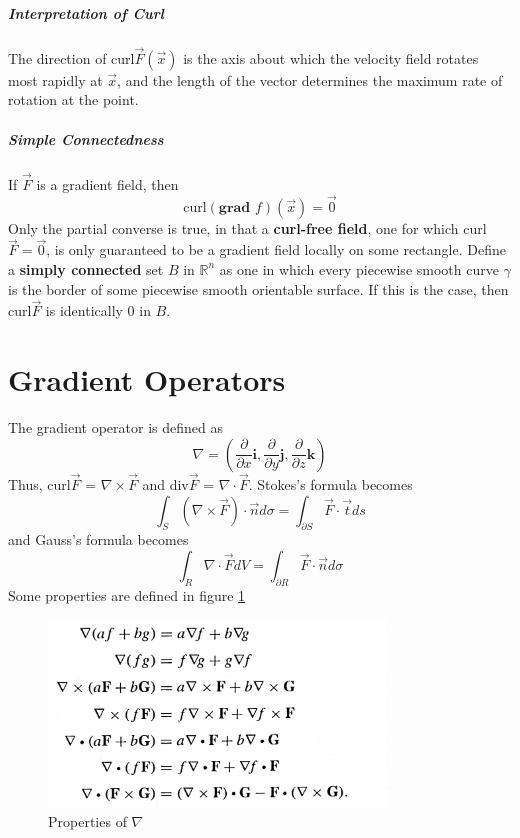 \documentclass[11pt]{article}
\begin{document}
	\subparagraph{Interpretation of Curl} The direction of curl$\vec{F}(\vec{x})$ is the axis about which the velocity field rotates most rapidly at $\vec{x}$, and the length of the vector determines the maximum rate of rotation at the point. 
	
	\subparagraph{Simple Connectedness} If $\vec{F}$ is a gradient field, then 
		\begin{equation}
			\text{curl}(\textbf{grad } f)(\vec{x}) = \vec{0}
		\end{equation}
		Only the partial converse is true, in that a \textbf{curl-free field}, one for which curl$\vec{F} = \vec{0}$, is only guaranteed to be a gradient field locally on some rectangle. Define a \textbf{simply connected} set $B$ in $\mathbb{R}^n$ as one in which every piecewise smooth curve $\gamma$ is the border of some piecewise smooth orientable surface. If this is the case, then curl$\vec{F}$ is identically 0 in $B$.
		
\section{Gradient Operators}
	The gradient operator is defined as
	\begin{equation}
		\nabla = \left( \frac{\partial}{\partial x} \mathbf{i}, \frac{\partial}{\partial y} \mathbf{j}, \frac{\partial}{\partial z} \mathbf{k} \right)
	\end{equation}
	Thus, curl$\vec{F}$ = $\nabla \times \vec{F}$ and div$\vec{F}$ = $\nabla \cdot \vec{F}$. Stokes's formula becomes
	\begin{equation}
		\int_S (\nabla \times \vec{F})\cdot \vec{n} d\sigma = \int_{\partial S} \vec{F} \cdot \vec{t} ds
	\end{equation}
	and Gauss's formula becomes
	\begin{equation}
		\int_R \nabla \cdot \vec{F} dV = \int_{\partial R} \vec{F} \cdot \vec{n} d\sigma
	\end{equation}
	Some properties are defined in figure \ref{fig:grad}
	
	\begin{figure}[htb]
		\centering
		\includegraphics[width=0.8\textwidth]{gradproperties.jpg}
		\caption{Properties of $\nabla$}
		\label{fig:grad}
	\end{figure}
	
\end{document}

